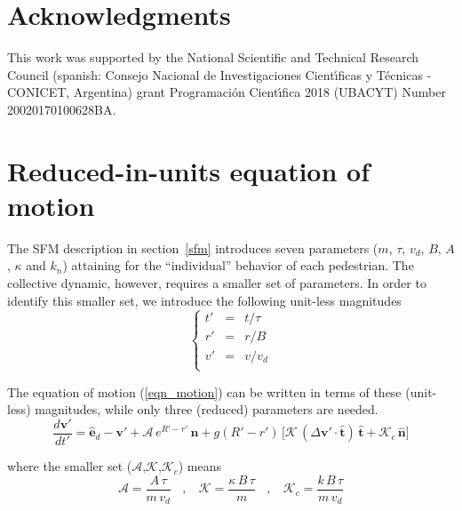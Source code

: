 \documentclass[preprint,12pt]{elsarticle}
\begin{document}
\section*{Acknowledgments}
This work was supported by the National Scientific and Technical 
Research Council (spanish: Consejo Nacional de Investigaciones Cient\'\i ficas 
y T\'ecnicas - CONICET, Argentina) grant Programaci\'on Cient\'\i fica 2018 (UBACYT) Number 20020170100628BA.

\appendix

\section{\label{appendix1}Reduced-in-units equation of motion}

The SFM description in section~\ref{sfm} introduces seven parameters ($m$, 
$\tau$, $v_d$, $B$, $A$, $\kappa$ and $k_n$) attaining for the ``individual'' 
behavior of each pedestrian. The collective dynamic, however, requires a 
smaller set of parameters. In order to identify this smaller set, we introduce 
the following unit-less magnitudes\\

\begin{equation}
 \left\{\begin{array}{lcl}
         t' & = & t/\tau \\
         r' & = & r/B \\
         v' & = & v/v_d \\
        \end{array}\right.
\end{equation}

The equation of motion (\ref{eqn_motion}) can be written in terms of these 
(unit-less) magnitudes, while only three (reduced) parameters are needed.\\


\begin{equation}
 \displaystyle\frac{d\mathbf{v}'}{dt'}=
 \hat{\mathbf{e}}_d-\mathbf{v}'+\mathcal{A}\,e^{R'-r'}\,
 \hat{\mathbf{n}}+g(R'-r')\,\bigg[\mathcal{K}\,(\Delta\mathbf{v}'\cdot
 \hat{\mathbf{t}})\,\hat{\mathbf{t}}+\mathcal{K}_c\,\hat{\mathbf{n}}\bigg]
\end{equation}



\noindent where the smaller set ($\mathcal{A}$,$\mathcal{K}$,$\mathcal{K}_c$) 
means\\

\begin{equation}
 \mathcal{A}=\displaystyle\frac{A\,\tau}{m\,v_d}\ \ \ \ , \ \ \ \ 
 \mathcal{K}=\displaystyle\frac{\kappa\,B\,\tau}{m}\ \ \ \ , \ \ \ \
 \mathcal{K}_c=\displaystyle\frac{k\,B\,\tau}{m\,v_d}
\end{equation}
\end{document}
